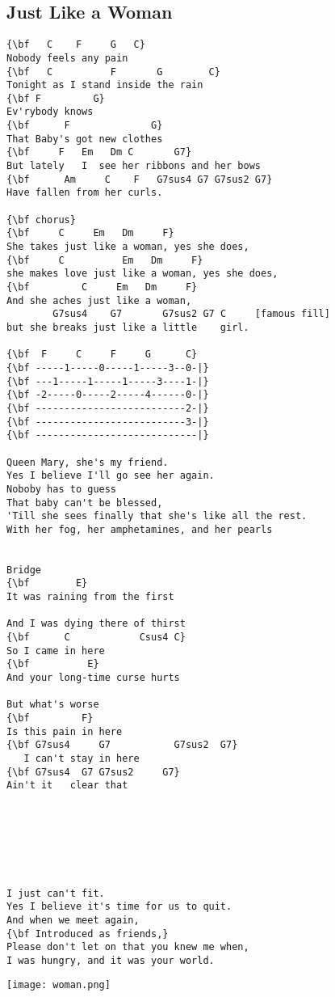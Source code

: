 \documentclass[a4paper]{article}
\begin{document}
\subsection{Just Like a Woman} %
\label{sub:Just Like a Wom}
\begin{Verbatim}[commandchars=\\\{\}]
{\bf   C    F     G   C}
Nobody feels any pain
{\bf   C          F       G        C}
Tonight as I stand inside the rain
{\bf F         G}
Ev'rybody knows
{\bf      F              G}
That Baby's got new clothes
{\bf     F   Em   Dm C       G7}
But lately   I  see her ribbons and her bows
{\bf      Am     C    F   G7sus4 G7 G7sus2 G7}
Have fallen from her curls.

{\bf chorus}
{\bf     C     Em   Dm     F}
She takes just like a woman, yes she does,
{\bf     C          Em   Dm     F}
she makes love just like a woman, yes she does,
{\bf         C     Em   Dm     F}
And she aches just like a woman,
        G7sus4    G7       G7sus2 G7 C     [famous fill]
but she breaks just like a little    girl.

{\bf  F     C     F     G      C}
{\bf -----1-----0-----1-----3--0-|}
{\bf ---1-----1-----1-----3----1-|}
{\bf -2-----0-----2-----4------0-|}
{\bf --------------------------2-|}
{\bf --------------------------3-|}
{\bf ----------------------------|}

Queen Mary, she's my friend.
Yes I believe I'll go see her again.
Noboby has to guess
That baby can't be blessed,
'Till she sees finally that she's like all the rest.
With her fog, her amphetamines, and her pearls


Bridge
{\bf        E}
It was raining from the first

And I was dying there of thirst
{\bf      C            Csus4 C}
So I came in here
{\bf          E}
And your long-time curse hurts

But what's worse
{\bf         F}
Is this pain in here
{\bf G7sus4     G7           G7sus2  G7}
   I can't stay in here
{\bf G7sus4  G7 G7sus2     G7}
Ain't it   clear that







I just can't fit.
Yes I believe it's time for us to quit.
And when we meet again,
{\bf Introduced as friends,}
Please don't let on that you knew me when,
I was hungry, and it was your world.
\end{Verbatim}
\vspace{3cm}
\centerline{\texttt{[image: woman.png]}}
\newpage
\end{document}
